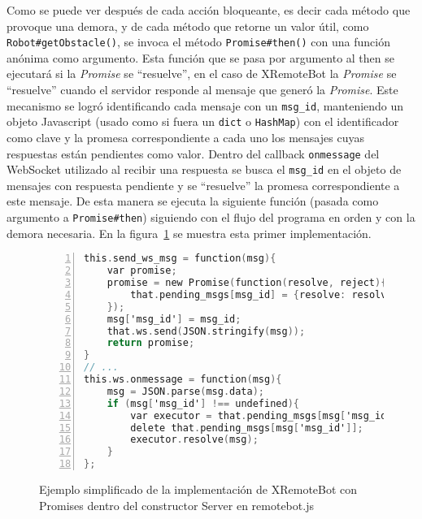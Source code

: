 Como se puede ver después de cada acción bloqueante, es decir cada método que
provoque una demora, y de cada método que retorne un valor útil, como
\texttt{Robot\#getObstacle()}, se invoca el método \texttt{Promise\#then()} con
una función anónima como argumento. Esta función que se pasa por argumento al
then se ejecutará si la \textit{Promise} se ``resuelve'', en el caso de
XRemoteBot la \textit{Promise} se ``resuelve'' cuando el servidor
responde al mensaje que generó la \textit{Promise}.
Este mecanismo se logró identificando cada mensaje con un \texttt{msg\_id},
manteniendo un objeto Javascript (usado como si fuera un \texttt{dict}
o \texttt{HashMap}) con el identificador como clave y la promesa
correspondiente a cada uno los mensajes cuyas respuestas están pendientes
como valor. Dentro del callback \texttt{onmessage} del WebSocket utilizado
al recibir una respuesta se busca el \texttt{msg\_id} en el objeto de
mensajes con respuesta pendiente y se ``resuelve'' la promesa correspondiente
a este mensaje. De esta manera se ejecuta la siguiente función (pasada como
argumento a \texttt{Promise\#then}) siguiendo con el flujo del programa
en orden y con la demora necesaria. En la
figura~\ref{lst:ejemplo_xremotebot_javascript_promises} se muestra esta primer
implementación.


\begin{figure}
    \begin{lstlisting}[language=C,numbers=left]
this.send_ws_msg = function(msg){
    var promise;
    promise = new Promise(function(resolve, reject){
        that.pending_msgs[msg_id] = {resolve: resolve, reject: reject};
    });
    msg['msg_id'] = msg_id;
    that.ws.send(JSON.stringify(msg));
    return promise;
}
// ...
this.ws.onmessage = function(msg){
    msg = JSON.parse(msg.data);
    if (msg['msg_id'] !== undefined){
        var executor = that.pending_msgs[msg['msg_id']];
        delete that.pending_msgs[msg['msg_id']];
        executor.resolve(msg);
    }
};
    \end{lstlisting}
    \caption{Ejemplo simplificado de la implementación de XRemoteBot con
             Promises dentro del constructor Server en remotebot.js}
    \label{lst:ejemplo_xremotebot_javascript_promises}
\end{figure}


